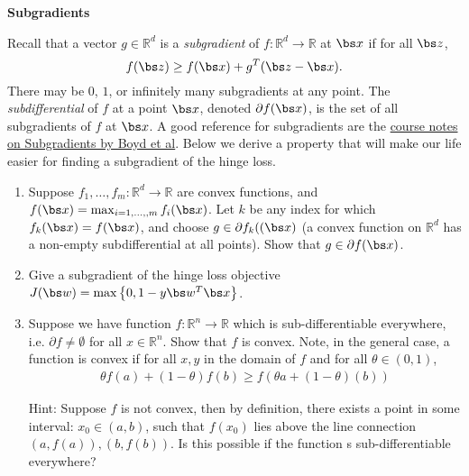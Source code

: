 \documentclass{article}
\newcommand{\nyuparagrah}[1]{\textcolor{nyupurple}{\large #1}}
\theoremstyle{plain}
\theoremstyle{definition}
\begin{document}
\nyuparagrah{\bf Subgradients} 

Recall that a vector $g\in\mathbb{R}^{d}$ is a \emph{subgradient} of
$f:\mathbb{R}^{d}\to\mathbb{R}$ at $\bs x$ if for all $\bs z$, 
\[
f(\bs z)\ge f(\bs x)+g^{T}(\bs z- \bs x).
\]
There may be $0$, $1$, or infinitely many
subgradients at any point. The \emph{subdifferential} of $f$ at
a point $\bs x$, denoted $\partial f(\bs x)$, is the set of all subgradients
of $f$ at $\bs x$. 
  A good reference for subgradients are the \href{https://stanford.edu/class/ee364b/lectures/subgradients_notes.pdf}{course notes on Subgradients by Boyd et al}.
Below we derive a property
that will make our life easier for finding a subgradient of the hinge
loss.

\begin{enumerate}
  \setcounter{enumi}{\value{saveenum}}
\item Suppose $f_{1},\ldots,f_{m}:\mathbb{R}^{d}\to\mathbb{R}$
are convex functions, and 
$f(\bs x)=\max_{i=1,\ldots,,m}f_{i}(\bs x)$.
Let $k$ be any index for which $f_{k}(\bs x)=f(\bs x)$, and choose $g\in\partial f_{k}((\bs x)$ (a convex function on $\mathbb{R}^{d}$ has
a non-empty subdifferential at all points). Show that $g\in\partial f(\bs x)$.

\item Give a subgradient of the hinge loss objective
$J(\bs w)=\max\left\{ 0,1-y \bs w^{T} \bs x\right\}$.
 
\item Suppose we have function $f:\mathbb{R}^n\rightarrow\mathbb{R}$ which is sub-differentiable everywhere, i.e. $\partial f\neq \emptyset$ for all $x\in\mathbb{R}^n$. Show that $f$ is convex. Note, in the general case, a function is convex if for all $x,y$ in the domain of $f$ and for all $\theta \in (0,1)$,
\begin{align*}
    \theta f(a)+(1-\theta)f(b) \geq f(\theta a+(1-\theta)(b))
\end{align*}

Hint: Suppose $f$ is not convex, then by definition, there exists a point in some interval: $x_0\in (a,b)$, such that $f(x_0)$ lies above the line connection $(a,f(a)), (b,f(b))$. Is this possible if the function s sub-differentiable everywhere? 

\setcounter{saveenum}{\value{enumi}}
\end{enumerate}
\end{document}
